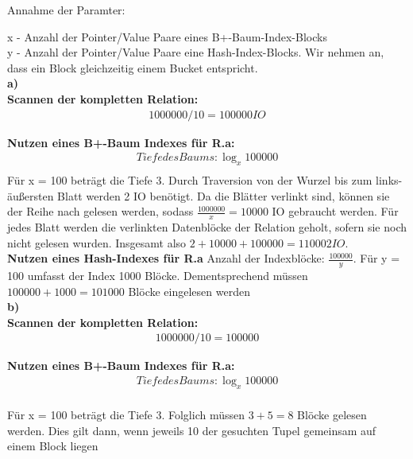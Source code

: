 \documentclass[12pt]{article}
\begin{document}
\noindent Annahme der Paramter:

x	-	Anzahl der Pointer/Value Paare eines B+-Baum-Index-Blocks \\
\indent y 	-	Anzahl der Pointer/Value Paare eine Hash-Index-Blocks. Wir
nehmen an, dass ein Block gleichzeitig einem Bucket entspricht. \\


\noindent \textbf{a)} \\
\textbf{Scannen der kompletten Relation:}
\begin{align*}
	1000000 / 10 = 100000  IO
\end{align*}

\noindent \textbf{Nutzen eines B+-Baum Indexes für R.a:}
\begin{align*}
	Tiefe des Baums:  \log_{x}100000 \\
\end{align*}
Für x = 100 beträgt die Tiefe 3.
Durch Traversion von der Wurzel bis zum links-äußersten Blatt werden 2 IO
benötigt. Da die Blätter verlinkt sind, können sie der Reihe nach gelesen
werden, sodass $\frac{1000000}{x}=10000$ IO gebraucht werden. Für jedes Blatt
werden die verlinkten Datenblöcke der Relation geholt, sofern sie noch nicht
gelesen wurden. Insgesamt also $2 + 10000 + 100000 = 110002 IO$.\\

\noindent \textbf{Nutzen eines Hash-Indexes für R.a}
Anzahl der Indexblöcke: $\frac{100000}{y}$.
Für y = 100 umfasst der Index 1000 Blöcke.
Dementsprechend müssen $100000+1000 = 101000$ Blöcke eingelesen werden\\

\noindent \textbf{b)} \\
\textbf{Scannen der kompletten Relation:}
\begin{align*}
	1000000 / 10 = 100000 
\end{align*}

\noindent \textbf{Nutzen eines B+-Baum Indexes für R.a:}
\begin{align*}
	Tiefe des Baums:  \log_{x}100000 \\
\end{align*}

Für x = 100 beträgt die Tiefe 3. Folglich müssen $3 + 5  =  8$ Blöcke gelesen werden.
Dies gilt dann, wenn jeweils 10 der gesuchten Tupel gemeinsam auf einem Block
liegen\\
\end{document}
